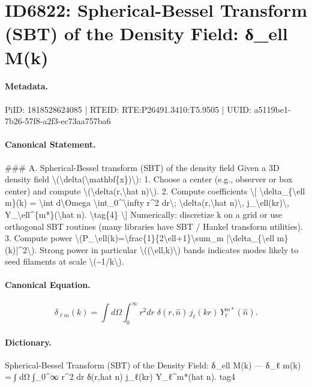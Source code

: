 \section*{ID6822: Spherical-Bessel Transform (SBT) of the Density Field: δ\_ell M(k)}
\paragraph{Metadata.}
PiID: 1818528624085 | RTEID: RTE:P26491.3410:T5.9505 | UUID: a5119be1-7b26-57f8-a2f3-ec73aa757ba6

\paragraph{Canonical Statement.}
\#\#\# A. Spherical-Bessel transform (SBT) of the density field Given a 3D density field \textbackslash{}(\textbackslash{}delta(\textbackslash{}mathbf\{x\})\textbackslash{}): 1. Choose a center (e.g., observer or box center) and compute \textbackslash{}(\textbackslash{}delta(r,\textbackslash{}hat n)\textbackslash{}). 2. Compute coefficients \textbackslash{}[ \textbackslash{}delta\_\{\textbackslash{}ell m\}(k) = \textbackslash{}int d\textbackslash{}Omega \textbackslash{}int\_0\textasciicircum{}\textbackslash{}infty r\textasciicircum{}2 dr\textbackslash{}; \textbackslash{}delta(r,\textbackslash{}hat n)\textbackslash{}, j\_\textbackslash{}ell(kr)\textbackslash{}, Y\_\textbackslash{}ell\textasciicircum{}\{m*\}(\textbackslash{}hat n). \textbackslash{}tag\{4\} \textbackslash{}] Numerically: discretize k on a grid or use orthogonal SBT routines (many libraries have SBT / Hankel transform utilities). 3. Compute power \textbackslash{}(P\_\textbackslash{}ell(k)=\textbackslash{}frac\{1\}\{2\textbackslash{}ell+1\}\textbackslash{}sum\_m |\textbackslash{}delta\_\{\textbackslash{}ell m\}(k)|\textasciicircum{}2\textbackslash{}). Strong power in particular \textbackslash{}((\textbackslash{}ell,k)\textbackslash{}) bands indicates modes likely to seed filaments at scale \textbackslash{}(\textasciitilde{}1/k\textbackslash{}).

\paragraph{Canonical Equation.}
\[
\delta_{\ell m}(k) = \int d\Omega \int_0^\infty r^2 dr\; \delta(r,\hat n)\, j_\ell(kr)\, Y_\ell^{m*}(\hat n). \tag{4}
\]

\paragraph{Dictionary.}
Spherical-Bessel Transform (SBT) of the Density Field: δ\_ell M(k) — δ\_ℓ m(k) = ∫ dΩ ∫\_0\textasciicircum{}∞ r\textasciicircum{}2 dr δ(r,hat n) j\_ℓ(kr) Y\_ℓ\textasciicircum{}m*(hat n). tag4

